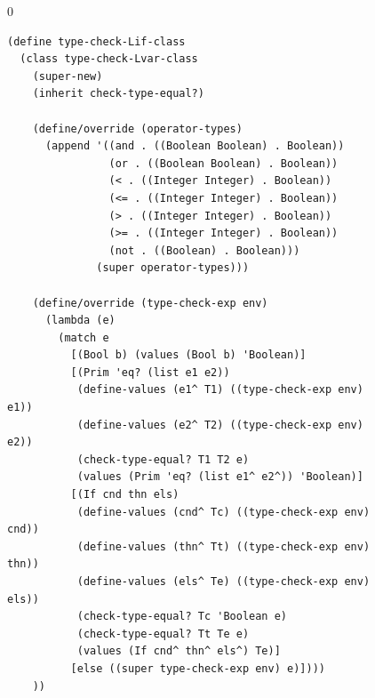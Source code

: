 \documentclass[7x10]{TimesAPriori_MIT}%
\def\racketEd{0}
\providecommand{\BookEdition}{1}
\let\edition\BookEdition
\numberwithin{theorem}{chapter}
\numberwithin{definition}{chapter}
\numberwithin{equation}{chapter}
\begin{document}
\begin{figure}[tbp]
\begin{tcolorbox}[colback=white]  
{\if\edition\racketEd    
\begin{lstlisting}[basicstyle=\ttfamily\footnotesize]
(define type-check-Lif-class
  (class type-check-Lvar-class
    (super-new)
    (inherit check-type-equal?)
    
    (define/override (operator-types)
      (append '((and . ((Boolean Boolean) . Boolean))
                (or . ((Boolean Boolean) . Boolean))
                (< . ((Integer Integer) . Boolean))
                (<= . ((Integer Integer) . Boolean))
                (> . ((Integer Integer) . Boolean))
                (>= . ((Integer Integer) . Boolean))
                (not . ((Boolean) . Boolean)))
              (super operator-types)))

    (define/override (type-check-exp env)
      (lambda (e)
        (match e
          [(Bool b) (values (Bool b) 'Boolean)]
          [(Prim 'eq? (list e1 e2))
           (define-values (e1^ T1) ((type-check-exp env) e1))
           (define-values (e2^ T2) ((type-check-exp env) e2))
           (check-type-equal? T1 T2 e)
           (values (Prim 'eq? (list e1^ e2^)) 'Boolean)]
          [(If cnd thn els)
           (define-values (cnd^ Tc) ((type-check-exp env) cnd))
           (define-values (thn^ Tt) ((type-check-exp env) thn))
           (define-values (els^ Te) ((type-check-exp env) els))
           (check-type-equal? Tc 'Boolean e)
           (check-type-equal? Tt Te e)
           (values (If cnd^ thn^ els^) Te)]
          [else ((super type-check-exp env) e)])))
    ))


\end{lstlisting}}
\end{tcolorbox}
\end{figure}
\end{document}
